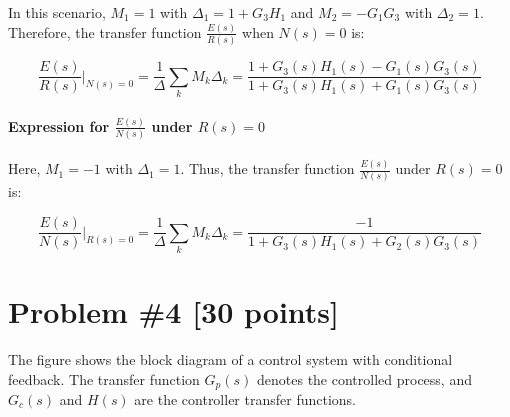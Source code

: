 \documentclass{article}
\begin{document}
In this scenario, \( M_1 = 1 \) with \(\Delta_1 = 1 + G_3H_1\) and \( M_2 = -G_1G_3 \) with \(\Delta_2 = 1\). Therefore, the transfer function \( \frac{E(s)}{R(s)} \) when \( N(s) = 0 \) is:

\[
\frac{E(s)}{R(s)} \bigg|_{N(s) = 0} = \frac{1}{\Delta} \sum_k M_k \Delta_k = \frac{1 + G_3(s)H_1(s) - G_1(s)G_3(s)}{1 + G_3(s)H_1(s) + G_1(s)G_3(s)}
\]

\paragraph{Expression for \( \frac{E(s)}{N(s)} \) under \( R(s) = 0 \)}

Here, \( M_1 = -1 \) with \(\Delta_1 = 1\). Thus, the transfer function \( \frac{E(s)}{N(s)} \) under \( R(s) = 0 \) is:

\[
\frac{E(s)}{N(s)} \bigg|_{R(s) = 0} = \frac{1}{\Delta} \sum_k M_k \Delta_k = \frac{-1}{1 + G_3(s)H_1(s) + G_2(s)G_3(s)}
\]


\newpage
\section*{Problem \#4 [30 points]}

The figure shows the block diagram of a control system with conditional feedback. The transfer function \( G_p(s) \) denotes the controlled process, and \( G_c(s) \) and \( H(s) \) are the controller transfer functions.
\end{document}

